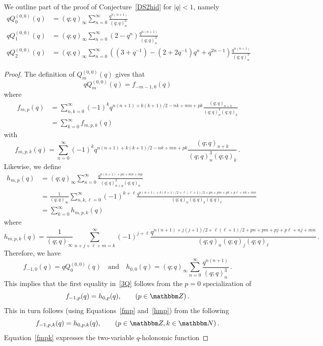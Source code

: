 \documentclass[12pt,reqno]{amsart}
\theoremstyle{definition}
\def\BN{\mathbbm N}
\def\BZ{\mathbbm Z}
\def\be{\begin{equation}}
\def\ee{\end{equation}}
\def\DS{Q} %
\begin{document}
We outline part of the proof of Conjecture~\ref{DS2hid} for $|q|<1$, namely
\be
\label{3Q}
\begin{aligned}
  q\DS^{(0,0)}_{0}(q)
  &=
  (q;q)_{\infty}\sum_{n=0}^{\infty}\frac{q^{n(n+1)}}{(q;q)_{n}^{3}}\\
  q\DS_{1}^{(0,0)}(q)
  &=
  (q;q)_{\infty}\sum_{n=0}^{\infty}(2-q^{n})\frac{q^{n(n+1)}}{(q;q)_{n}^{3}}\\
  q\DS_{2}^{(0,0)}(q)
  &=
  (q;q)_{\infty}\sum_{n=0}^{\infty}
  \left((3+q^{-1})-(2+2q^{-1})q^{n}+q^{2n-1}\right)\frac{q^{n(n+1)}}{(q;q)_{n}^{3}}
\end{aligned}
\ee
\begin{proof}
The definition of $\DS_{m}^{(0,0)}(q)$ gives that
\be
q\DS_{m}^{(0,0)}(q)= f_{-m-1,0}(q)
\ee
where
\be
\label{fmp}
\begin{aligned}
  f_{m,p}(q)
  & =
  \sum_{n,k=0}^{\infty}(-1)^{k}q^{n(n+1)+k(k+1)/2-nk+mn+pk}
  \frac{(q;q)_{n+k}}{(q;q)_{n}^{3}(q;q)_{k}}
  \\
  & =\sum_{k=0}^{\infty}f_{m,p,k}(q)
\end{aligned}
\ee
with
\be
\label{fmpk}
  f_{m,p,k}(q)
  =
  \sum_{n=0}^{\infty}(-1)^{k}q^{n(n+1)+k(k+1)/2-nk+mn+pk}
  \frac{(q;q)_{n+k}}{(q;q)_{n}^{3}(q;q)_{k}} \,.
\ee
Likewise, we define
\be
\label{hmp}
\begin{aligned}
  h_{m,p}(q)
  &=
  (q;q)_{\infty}\sum_{n=0}^{\infty}\frac{q^{n(n+1)+pn+mn+mp}}{(q;q)_{n+p}^{2}(q;q)_{n}}
  \\
  &=
  \frac{1}{(q;q)_{\infty}}\sum_{n,k,\ell=0}^{\infty}(-1)^{k+\ell}\frac{q^{n(n+1)+k(k+1)/2
      +\ell(\ell+1)/2+pn+pm+pk+p\ell+nk+mn}}{(q;q)_{n}(q;q)_{k}(q;q)_{\ell}}
  \\
  &=\sum_{k=0}^{\infty}h_{m,p,k}(q)
\end{aligned}
\ee
where
\be
  h_{m,p,k}(q)
  =
  \frac{1}{(q;q)_{\infty}}\sum_{n+j+\ell+m=k}^{\infty}(-1)^{j+\ell}
  \frac{q^{n(n+1)+j(j+1)/2
  +\ell(\ell+1)/2+pn+pm+pj+p\ell+nj+mn}}{(q;q)_{n}(q;q)_{j}(q;q)_{\ell}} \,.
\ee
Therefore, we have
\be
  f_{-1,0}(q)
  =
  q\DS^{(0,0)}_{0}(q)
  \quad
  \text{and}
  \quad
  h_{0,0}(q)
  =
  (q;q)_{\infty}\sum_{n=0}^{\infty}\frac{q^{n(n+1)}}{(q;q)_{n}^{3}} \,.
\ee
This implies that the first equality in~\eqref{3Q} follows from the $p=0$
specialization of 
\be
  f_{-1,p}(q)=h_{0,p}(q), \qquad (p \in \BZ) \,.
\ee
This in turn follows (using Equations~\eqref{fmp} and~\eqref{hmp}) from
the following
\be
\label{f=h}
  f_{-1,p,k}(q)=h_{0,p,k}(q), \qquad (p \in \BZ, k \in \BN) \,.
\ee
Equation~\eqref{fmpk} expresses the two-variable $q$-holonomic function

\end{proof}
\end{document}
